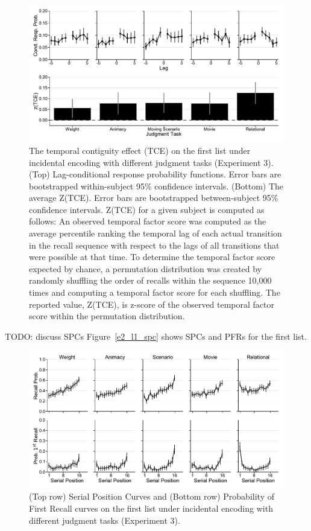 \documentclass[jou,natbib,floatsintext]{apa6} %
\begin{document}
\begin{figure}%
\includegraphics{figures/E3_crp_list1.pdf}
\caption{The temporal contiguity effect (TCE) on the first list under incidental encoding with different judgment tasks (Experiment 3). (Top) Lag-conditional response probability functions. Error bars are bootstrapped within-subject 95\% confidence intervals. (Bottom) The average Z(TCE).  Error bars are bootstrapped between-subject 95\% confidence intervals. Z(TCE) for a given subject is computed as follows: An observed temporal factor score was computed as the average percentile ranking the temporal lag of each actual transition in the recall sequence with respect to the lags of all transitions that were possible at that time. To determine the temporal factor score expected by chance, a permutation distribution was created by randomly shuffling the order of recalls within the sequence 10,000 times and computing a temporal factor score for each shuffling. The reported value, Z(TCE), is z-score of the observed temporal factor score within the permutation distribution.}
\label{E3}
\end{figure}


\color{red}
TODO: discuss SPCs
Figure~\ref{e2_l1_spc} shows SPCs and PFRs for the first list.


\begin{figure}
\includegraphics{figures/E3_spc_list1.pdf}
\caption{(Top row) Serial Position Curves and (Bottom row) Probability of First Recall curves on the first list under incidental encoding with different judgment tasks (Experiment 3). \spcpaneltext}
\label{e3_l1_spc}
\end{figure}
\end{document}
